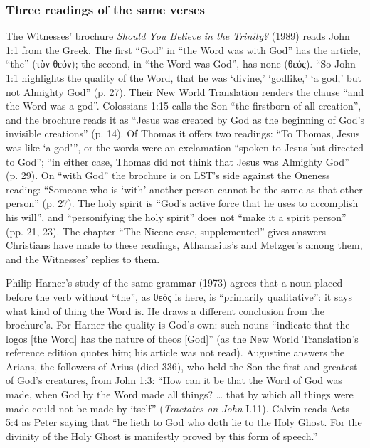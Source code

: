 \documentclass[11pt,paper=\testimonypaper,DIV=13,parskip=false]{scrartcl}
\begin{document}
\subsubsection*{Three readings of the same verses}
The Witnesses’ brochure \emph{Should You Believe in the Trinity?} (1989) reads John 1:1 from the Greek. The first “God” in “the Word was with God” has the article, “the” (τὸν θεόν); the second, in “the Word was God”, has none (θεός). “So John 1:1 highlights the quality of the Word, that he was ‘divine,’ ‘godlike,’ ‘a god,’ but not Almighty God” (p. 27). Their New World Translation renders the clause “and the Word was a god”. Colossians 1:15 calls the Son “the firstborn of all creation”, and the brochure reads it as “Jesus was created by God as the beginning of God’s invisible creations” (p. 14). Of Thomas it offers two readings: “To Thomas, Jesus was like ‘a god’”, or the words were an exclamation “spoken to Jesus but directed to God”; “in either case, Thomas did not think that Jesus was Almighty God” (p. 29). On “with God” the brochure is on LST’s side against the Oneness reading: “Someone who is ‘with’ another person cannot be the same as that other person” (p. 27). The holy spirit is “God’s active force that he uses to accomplish his will”, and “personifying the holy spirit” does not “make it a spirit person” (pp. 21, 23). The chapter “The Nicene case, supplemented” gives answers Christians have made to these readings, Athanasius’s and Metzger’s among them, and the Witnesses’ replies to them.

Philip Harner’s study of the same grammar (1973) agrees that a noun placed before the verb without “the”, as θεός is here, is “primarily qualitative”: it says what kind of thing the Word is. He draws a different conclusion from the brochure’s. For Harner the quality is God’s own: such nouns “indicate that the logos [the Word] has the nature of theos [God]” (as the New World Translation’s reference edition quotes him; his article was not read). Augustine answers the Arians, the followers of Arius (died 336), who held the Son the first and greatest of God’s creatures, from John 1:3: “How can it be that the Word of God was made, when God by the Word made all things? … that by which all things were made could not be made by itself” (\emph{Tractates on John} I.11). Calvin reads Acts 5:4 as Peter saying that “he lieth to God who doth lie to the Holy Ghost. For the divinity of the Holy Ghost is manifestly proved by this form of speech.”
\end{document}
